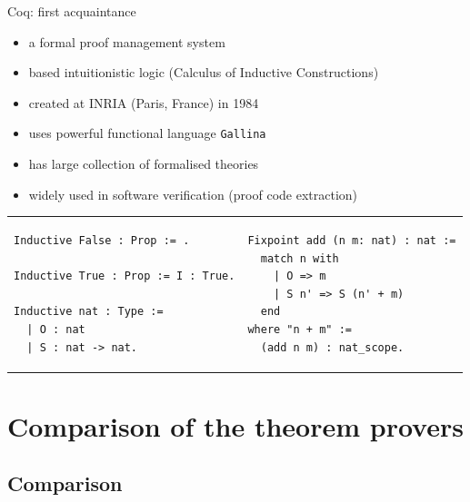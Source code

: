 \documentclass[aspectratio=169, fleqn]{beamer}
\begin{document}
\begin{frame}[fragile]{Coq: first acquaintance}

\vspace{10pt}
\begin{itemize}
  \item a formal proof management system
  \item based intuitionistic logic \textcolor{dkgray}{ (Calculus of Inductive Constructions) }
  \item created at INRIA (Paris, France) in 1984
  \item \textcolor{dkgray}{ uses powerful functional language \texttt{Gallina} }
  \item \textcolor{dkgray}{ has large collection of formalised theories }
  \item \textcolor{dkgray}{ widely used in software verification (proof code extraction) }
\end{itemize}


\begin{tabular}{p{.45\linewidth} p{.45\linewidth}}
\begin{lstlisting}[language=coq, caption={Definition of basic datatypes 
%in Isabelle:
}]
Inductive False : Prop := .

Inductive True : Prop := I : True.

Inductive nat : Type :=
  | O : nat
  | S : nat -> nat.
\end{lstlisting}
&

\begin{lstlisting}[language=isabelle,caption={Definition of addition over \texttt{nat}}]
Fixpoint add (n m: nat) : nat :=
  match n with
    | O => m
    | S n' => S (n' + m)
  end
where "n + m" :=
  (add n m) : nat_scope.
\end{lstlisting}
\end{tabular}

\end{frame}



\section{Comparison of the theorem provers}

\subsection{Comparison}
\end{document}
